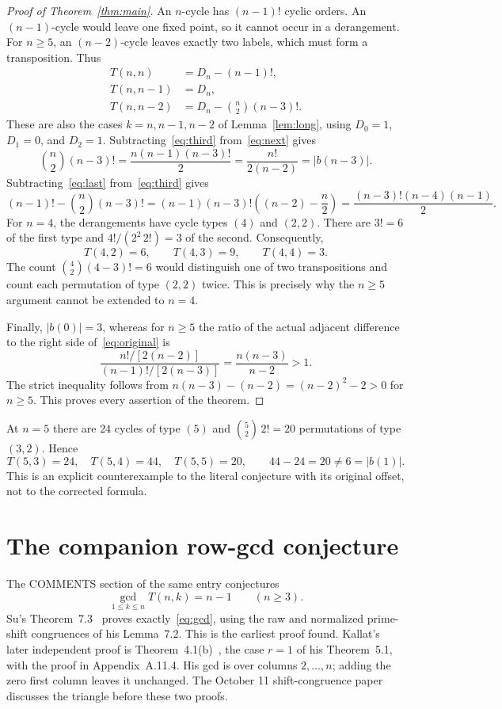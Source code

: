 \documentclass[11pt]{article}
\newcommand{\Der}{D}
\begin{document}
\begin{proof}[Proof of Theorem~\ref{thm:main}]
An $n$-cycle has $(n-1)!$ cyclic orders. An $(n-1)$-cycle would leave one
fixed point, so it cannot occur in a derangement. For $n\geq5$, an $(n-2)$-cycle
leaves exactly two labels, which must form a transposition. Thus
\begin{align}
 T(n,n)&=\Der_n-(n-1)!,\label{eq:last}\\
 T(n,n-1)&=\Der_n,\label{eq:next}\\
 T(n,n-2)&=\Der_n-\binom n2(n-3)!.\label{eq:third}
\end{align}
These are also the cases $k=n,n-1,n-2$ of Lemma~\ref{lem:long}, using
$\Der_0=1$, $\Der_1=0$, and $\Der_2=1$.
Subtracting~\eqref{eq:third} from~\eqref{eq:next} gives
\[
 \binom n2(n-3)!=\frac{n(n-1)(n-3)!}{2}
              =\frac{n!}{2(n-2)}=|b(n-3)|.
\]
Subtracting~\eqref{eq:last} from~\eqref{eq:third} gives
\[
 (n-1)!-\binom n2(n-3)!
 =(n-1)(n-3)!\left((n-2)-\frac n2\right)
 =\frac{(n-3)!(n-4)(n-1)}2.
\]
For $n=4$, the derangements have cycle types $(4)$ and $(2,2)$.
There are $3!=6$ of the first type and $4!/(2^2\,2!)=3$ of the second.
Consequently,
\[
 T(4,2)=6,\qquad T(4,3)=9,\qquad T(4,4)=3.
\]
The count $\binom42(4-3)!=6$ would distinguish one of two transpositions
and count each permutation of type $(2,2)$ twice. This is precisely why
the $n\geq5$ argument cannot be extended to $n=4$.

Finally, $|b(0)|=3$, whereas for $n\geq5$ the ratio of the actual adjacent
difference to the right side of~\eqref{eq:original} is
\[
 \frac{n!/[2(n-2)]}{(n-1)!/[2(n-3)]}
 =\frac{n(n-3)}{n-2}>1.
\]
The strict inequality follows from
$n(n-3)-(n-2)=(n-2)^2-2>0$ for $n\geq5$.
This proves every assertion of the theorem.
\end{proof}

At $n=5$ there are $24$ cycles of type $(5)$ and
$\binom52\,2!=20$ permutations of type $(3,2)$. Hence
\[
 T(5,3)=24,\quad T(5,4)=44,\quad T(5,5)=20,
 \qquad 44-24=20\ne6=|b(1)|.
\]
This is an explicit counterexample to the literal conjecture with its original
offset, not to the corrected formula.

\section{The companion row-gcd conjecture}

The COMMENTS section of the same entry conjectures
\begin{equation}\label{eq:gcd}
 \gcd_{1\leq k\leq n}T(n,k)=n-1\qquad(n\geq3).
\end{equation}
Su's Theorem~7.3~\cite{su} proves exactly~\eqref{eq:gcd}, using the raw and
normalized prime-shift congruences of his Lemma~7.2. This is the earliest
proof found. Kallat's later independent proof is Theorem~4.1(b)~\cite{valuation},
the case $r=1$ of his Theorem~5.1, with the proof in Appendix~A.11.4.
His gcd is over columns $2,\ldots,n$; adding the zero first column leaves it
unchanged. The October 11 shift-congruence paper~\cite[p.~27]{shift}
discusses the triangle before these two proofs.
\end{document}
